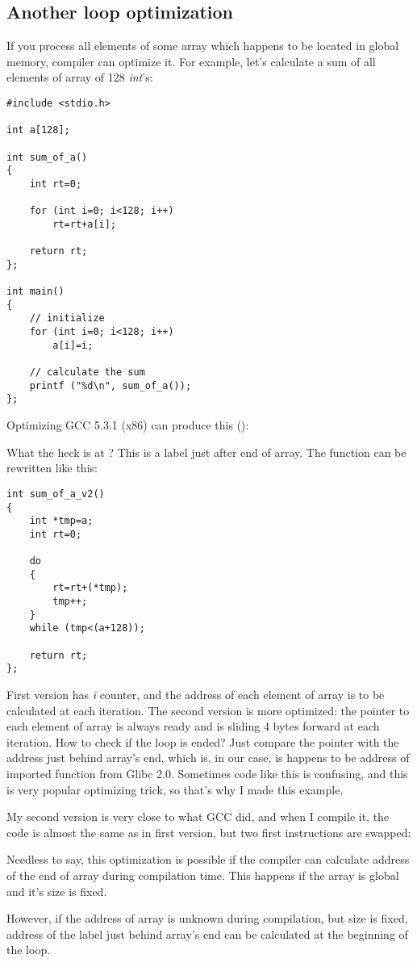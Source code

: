 \subsection{Another loop optimization}

If you process all elements of some array which happens to be located in global memory, compiler can optimize it.
For example, let's calculate a sum of all elements of array of 128 \emph{int}'s:

\begin{lstlisting}[style=customc]
#include <stdio.h>

int a[128];

int sum_of_a()
{
	int rt=0;
	
	for (int i=0; i<128; i++)
		rt=rt+a[i];

	return rt;
};

int main()
{
	// initialize
	for (int i=0; i<128; i++)
		a[i]=i;
	
	// calculate the sum
	printf ("%d\n", sum_of_a());
};
\end{lstlisting}

Optimizing GCC 5.3.1 (x86) can produce this (\IDA):



What the heck is  at ?
This is a label just after end of  array.
The function can be rewritten like this:

\begin{lstlisting}[style=customc]
int sum_of_a_v2()
{
	int *tmp=a;
	int rt=0;
	
	do
	{
		rt=rt+(*tmp);
		tmp++;
	}
	while (tmp<(a+128));

	return rt;
};
\end{lstlisting}

First version has \emph{i} counter, and the address of each element of array is to be calculated at each iteration.
The second version is more optimized: the pointer to each element of array is always ready and is sliding 4 bytes forward at each iteration.
How to check if the loop is ended?
Just compare the pointer with the address just behind array's end, which is, in our case, is happens to be address of imported  function from Glibc 2.0.
Sometimes code like this is confusing, and this is very popular optimizing trick, so that's why I made this example.

My second version is very close to what GCC did, and when I compile it, the code is almost the same as in first version, but two first instructions are swapped:



Needless to say, this optimization is possible if the compiler can calculate address of the end of array during compilation time.
This happens if the array is global and it's size is fixed.

However, if the address of array is unknown during compilation, but size is fixed, address of the label just behind array's end can be calculated at the beginning of the loop.

